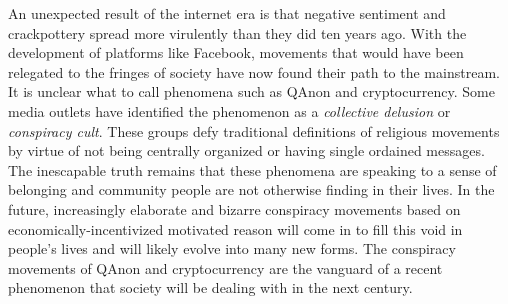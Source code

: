 An unexpected result of the internet era is that negative sentiment and
crackpottery spread more virulently than they did ten years ago. With the
development of platforms like Facebook, movements that would have been relegated
to the fringes of society have now found their path to the mainstream. It is
unclear what to call phenomena such as QAnon and cryptocurrency. Some media
outlets have identified the phenomenon as a \textit{collective delusion} or
\textit{conspiracy cult}. These groups defy traditional definitions of religious
movements by virtue of not being centrally organized or having single ordained
messages. The inescapable truth remains that these phenomena are speaking to a
sense of belonging and community people are not otherwise finding in their
lives. In the future, increasingly elaborate and bizarre conspiracy movements
based on economically-incentivized motivated reason will come in to fill this
void in people's lives and will likely evolve into many new forms. The
conspiracy movements of QAnon and cryptocurrency are the vanguard of a recent
phenomenon that society will be dealing with in the next century.

